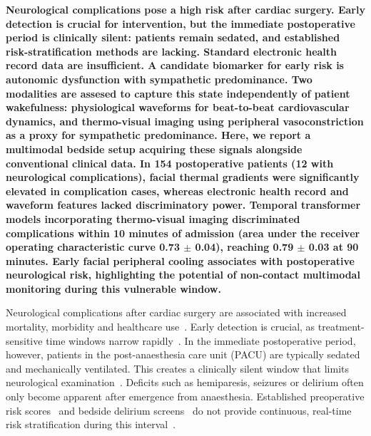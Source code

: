 \documentclass[11pt]{article}
\begin{document}
\textbf{Neurological complications pose a high risk after cardiac surgery. Early detection is crucial for intervention, but the immediate postoperative period is clinically silent: patients remain sedated, and established risk-stratification methods are lacking. Standard electronic health record data are insufficient. A candidate biomarker for early risk is autonomic dysfunction with sympathetic predominance. Two modalities are assesed to capture this state independently of patient wakefulness: physiological waveforms for beat-to-beat cardiovascular dynamics, and thermo-visual imaging using peripheral vasoconstriction as a proxy for sympathetic predominance. Here, we report a multimodal bedside setup acquiring these signals alongside conventional clinical data. In 154 postoperative patients (12 with neurological complications), facial thermal gradients were significantly elevated in complication cases, whereas electronic health record and waveform features lacked discriminatory power. Temporal transformer models incorporating thermo-visual imaging discriminated complications within 10 minutes of admission (area under the receiver operating characteristic curve 0.73 $\pm$ 0.04), reaching 0.79 $\pm$ 0.03 at 90 minutes. Early facial peripheral cooling associates with postoperative neurological risk, highlighting the potential of non-contact multimodal monitoring during this vulnerable window.}

\vspace{1ex}


Neurological complications after cardiac surgery are associated with increased mortality, morbidity and healthcare use~\citep{arrowsmith2000central}. Early detection is crucial, as treatment-sensitive time windows narrow rapidly~\citep{saver2006time, saver2016time, selim2007perioperative}. In the immediate postoperative period, however, patients in the post-anaesthesia care unit (PACU) are typically sedated and mechanically ventilated. This creates a clinically silent window that limits neurological examination~\citep{salazar2001stroke, liu2022recent}. Deficits such as hemiparesis, seizures or delirium often only become apparent after emergence from anaesthesia. Established preoperative risk scores~\citep{euroscore2,sts2018} and bedside delirium screens~\citep{ely2001camicu,nudesc} do not provide continuous, real-time risk stratification during this interval~\citep{amundson2020timing}.
\end{document}
